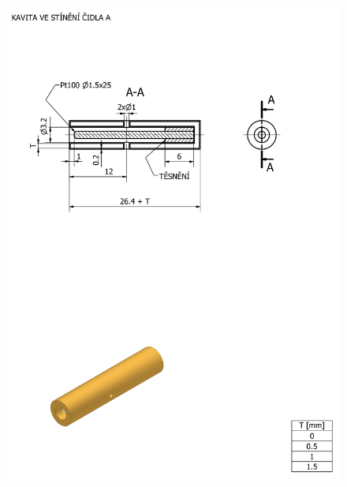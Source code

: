     \begin{figure}[ht!]
        \centering
        \includegraphics[width=\textwidth]{400_SIMULACE_KONSTRUKCNICH_UPRAV/Vykresy_rendery/Kavita_vykres.png}
    \end{figure}
    \newpage
{} \label{fig:kavita-B-vykres}

